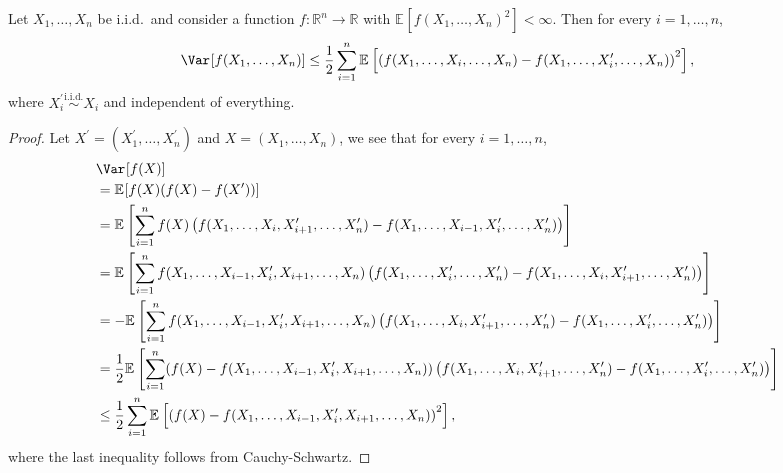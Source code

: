 \begin{theorem}
	Let \(X_1, \dots , X_n\) be i.i.d.\ and consider a function \(f\colon \mathbb{R} ^n \to \mathbb{R} \) with \(\mathbb{E}_{}[f(X_1, \dots , X_n)^2] < \infty \). Then for every \(i = 1, \dots , n\),
	\[
		\Var_{}[f(X_1, \dots , X_n)]
		\leq \frac{1}{2} \sum_{i=1}^{n} \mathbb{E}_{}\left[\left( f(X_1, \dots , X_i, \dots , X_n) - f(X_1, \dots , X_i^{\prime} , \dots , X_n)\right) ^2 \right] ,
	\]
	where \(X_i^{\prime} \overset{\text{i.i.d.} }{\sim } X_i\) and independent of everything.
\end{theorem}
\begin{proof}
	Let \(X^{\prime} = (X_1^{\prime} , \dots , X_n^{\prime} )\) and \(X = (X_1, \dots , X_n)\), we see that for every \(i = 1, \dots , n\),
	\[
		\begin{split}
			 & \Var_{}[f(X)]                                                                                                                                                                                                                                                      \\
			 & = \mathbb{E}_{}[f(X) (f(X) - f(X^{\prime} ))]                                                                                                                                                                                                                      \\
			 & = \mathbb{E}_{}\left[\sum_{i=1}^{n} f(X) \left( f(X_1, \dots , X_i, X_{i+1}^{\prime} , \dots , X_n^{\prime} ) - f(X_1, \dots , X_{i-1} , X_i^{\prime} , \dots , X_n^{\prime} ) \right) \right]                                                                     \\
			 & = \mathbb{E}_{}\left[\sum_{i=1}^{n} f(X_1, \dots , X_{i-1}, X_i^{\prime} , X_{i+1}, \dots , X_n) \left( f(X_1, \dots , X_i^{\prime} , \dots , X_n^{\prime} ) - f(X_1, \dots , X_i , X_{i+1}^{\prime} , \dots , X_n^{\prime} ) \right) \right]                      \\
			 & = - \mathbb{E}_{}\left[\sum_{i=1}^{n} f(X_1, \dots , X_{i-1}, X_i^{\prime} , X_{i+1}, \dots , X_n) \left( f(X_1, \dots , X_i , X_{i+1}^{\prime} , \dots , X_n^{\prime} ) - f(X_1, \dots , X_i^{\prime} , \dots , X_n^{\prime} ) \right) \right]                    \\
			 & = \frac{1}{2} \mathbb{E}_{}\left[\sum_{i=1}^{n} (f(X) - f(X_1, \dots , X_{i-1}, X_i^{\prime} , X_{i+1}, \dots , X_n)) \left( f(X_1, \dots , X_i , X_{i+1}^{\prime} , \dots , X_n^{\prime} ) - f(X_1, \dots , X_i^{\prime} , \dots , X_n^{\prime} ) \right) \right] \\
			 & \leq \frac{1}{2} \sum_{i=1}^{n} \mathbb{E}_{}\left[\left( f(X) - f(X_1, \dots , X_{i-1} , X_i^{\prime} , X_{i+1}, \dots , X_n) \right) ^2 \right] ,
		\end{split}
	\]
	where the last inequality follows from Cauchy-Schwartz.
\end{proof}

